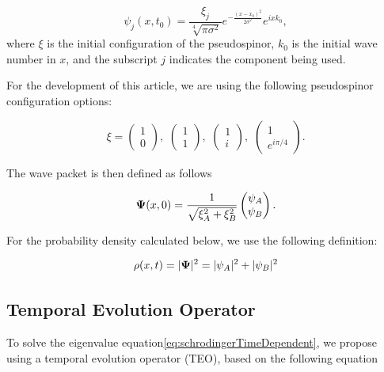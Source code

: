 \begin{equation}
    \label{eq:GWP}
    \psi_j(x,t_0)=\frac{\xi_j}{\sqrt[4]{\pi\sigma^2}}e^{-\frac{(x-x_0)^2}{2\sigma^2}}e^{ixk_0},
\end{equation}
\noindent where $\xi$ is the initial configuration of the pseudospinor, $k_0$ is the initial wave number in $x$, and the subscript $j$ indicates the component being used.

For the development of this article, we are using the following pseudospinor configuration options:

\begin{equation}
    \label{eq:pseudospinorConfigurations}
    \xi=\begin{pmatrix}
            1\\0
    \end{pmatrix},\,\,\begin{pmatrix}
                          1\\1
    \end{pmatrix},\,\,\begin{pmatrix}
                          1\\i
    \end{pmatrix},\,\,\begin{pmatrix}
                          1\\e^{i\pi/4}
    \end{pmatrix}.
\end{equation}

The wave packet is then defined as follows

\begin{equation}
    \label{eq:FinalGWP}
    \mbox{\boldmath $\Psi$}(x,0)=\frac{1}{\sqrt {\xi_A^2 + \xi_B^2}}\begin{pmatrix}
                                                          \psi_A\\\psi_B
    \end{pmatrix}.
\end{equation}

For the probability density calculated below, we use the following definition:

\begin{equation}
    \label{eq:probDens}
    \rho(x,t)=|\mbox{\boldmath $\Psi$}|^2 = |\psi_A|^2+|\psi_B|^2
\end{equation}

\subsection{Temporal Evolution Operator}\label{subsec:temporal-evolution-operator}
To solve the eigenvalue equation\eqref{eq:schrodingerTimeDependent}, we propose using a temporal evolution operator (TEO), based on the following equation

